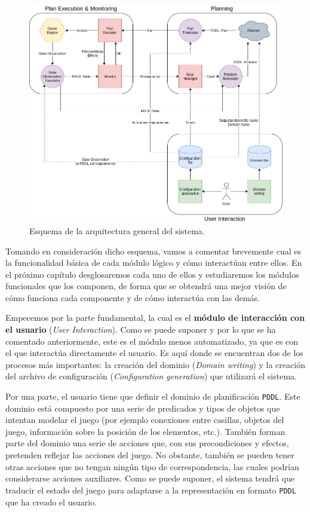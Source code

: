 \begin{figure}[H]
    \centering
    \includegraphics[scale=0.4]{img/CH04/system_arch.png}
    \caption{Esquema de la arquitectura general del sistema.}
    \label{fig:system_arch}
\end{figure}

Tomando en consideración dicho esquema, vamos a comentar brevemente cual es
la funcionalidad básica de cada módulo lógico y cómo interactúan entre ellos.
En el próximo capítulo desglosaremos cada uno de ellos y estudiaremos los módulos
funcionales que los componen, de forma que se obtendrá una mejor visión de cómo
funciona cada componente y de cómo interactúa con las demás.

Empecemos por la parte fundamental, la cual es el \textbf{módulo de interacción con el usuario}
(\textit{User Interaction}). Como se puede suponer y por lo que se ha comentado anteriormente,
este es el módulo menos automatizado, ya que es con el que interactúa directamente el usuario.
Es aquí donde se encuentran dos de los procesos más importantes: la creación del dominio
(\textit{Domain writing}) y la creación del archivo de configuración
(\textit{Configuration generation}) que utilizará el sistema.

Por una parte, el usuario tiene que definir el dominio de planificación \texttt{PDDL}. Este dominio está
compuesto por una serie de predicados y tipos de objetos que intentan modelar el
juego (por ejemplo conexiones entre casillas, objetos del juego, información sobre la
posición de los elementos, etc.). También forman parte del dominio una serie de acciones
que, con sus precondiciones y efectos, pretenden reflejar las acciones del juego. No obstante,
también se pueden tener otras acciones que no tengan ningún tipo de correspondencia, las cuales
podrían considerarse acciones auxiliares. Como se puede suponer, el sistema tendrá que traducir
el estado del juego para adaptarse a la representación en formato \texttt{PDDL} que ha
creado el usuario.

